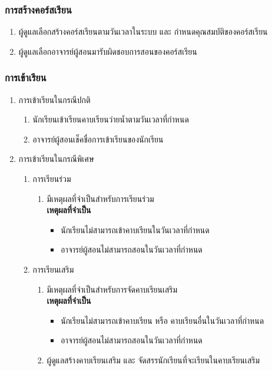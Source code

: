 \subsubsection{การสร้างคอร์สเรียน}

\begin{enumerate}
    \item ผู้ดูแลเลือกสร้างคอร์สเรียนตามวันเวลาในระบบ และ กำหนดคุณสมบัติของคอร์สเรียน
    \item ผู้ดูแลเลือกอาจารย์ผู้สอนมารับผิดชอบการสอนของคอร์สเรียน
\end{enumerate}

\subsubsection{การเข้าเรียน}

\begin{enumerate}
    \item การเข้าเรียนในกรณีปกติ
    \begin{enumerate}
        \item นักเรียนเข้าเรียนคาบเรียนว่ายนํ้าตามวันเวลาที่กำหนด
        \item อาจารย์ผู้สอนเช็คชื่อการเข้าเรียนของนักเรียน
    \end{enumerate}
    \item การเข้าเรียนในกรณีพิเศษ
    \begin{enumerate}
        \item การเรียนร่วม
        \begin{enumerate}
            \item มีเหตุผลที่จำเป็นสำหรับการเรียนร่วม\\
                \textbf{เหตุผลที่จำเป็น}\\
                \begin{itemize}
                    \item นักเรียนไม่สามารถเข้าคาบเรียนในวันเวลาที่กำหนด
                    \item อาจารย์ผู้สอนไม่สามารถสอนในวันเวลาที่กำหนด
                \end{itemize}
        \end{enumerate}
        \item การเรียนเสริม
        \begin{enumerate}
            \item มีเหตุผลที่จำเป็นสำหรับการจัดคาบเรียนเสริม\\
            \textbf{เหตุผลที่จำเป็น}\\
            \begin{itemize}
                \item นักเรียนไม่สามารถเข้าคาบเรียน หรือ คาบเรียนอื่นในวันเวลาที่กำหนด
                \item อาจารย์ผู้สอนไม่สามารถสอนในวันเวลาที่กำหนด
            \end{itemize}
            \item ผู้ดูแลสร้างคาบเรียนเสริม และ จัดสรรนักเรียนที่จะเรียนในคาบเรียนเสริม
        \end{enumerate}
    \end{enumerate}
\end{enumerate}

